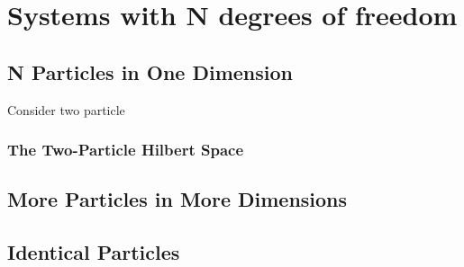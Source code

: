 \chapter{Systems with N degrees of freedom}
\section{N Particles in One Dimension}
Consider two particle 
\subsection{The Two-Particle Hilbert Space}
\section{More Particles in More Dimensions}
\section{Identical Particles}